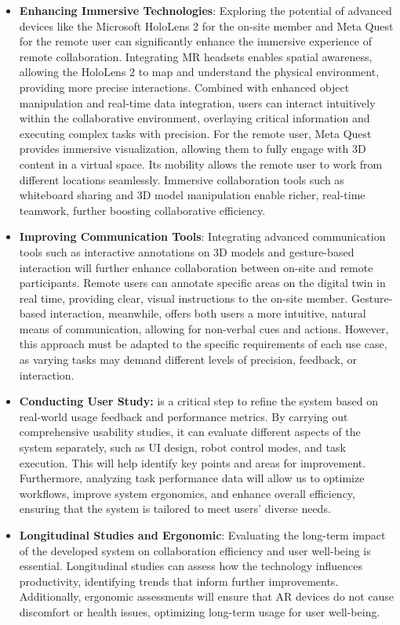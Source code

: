 \begin{itemize}
    \item \textbf{Enhancing Immersive Technologies}: Exploring the potential of advanced devices like the Microsoft HoloLens 2 for the on-site member and Meta Quest for the remote user can significantly enhance the immersive experience of remote collaboration. Integrating \ac{MR} headsets enables spatial awareness, allowing the HoloLens 2 to map and understand the physical environment, providing more precise interactions. Combined with enhanced object manipulation and real-time data integration, users can interact intuitively within the collaborative environment, overlaying critical information and executing complex tasks with precision. 
    For the remote user, Meta Quest provides immersive visualization, allowing them to fully engage with 3D content in a virtual space. Its mobility allows the remote user to work from different locations seamlessly. Immersive collaboration tools such as whiteboard sharing and 3D model manipulation enable richer, real-time teamwork, further boosting collaborative efficiency. 
    \item \textbf{Improving Communication Tools}: Integrating advanced communication tools such as interactive annotations on 3D models and gesture-based interaction will further enhance collaboration between on-site and remote participants. Remote users can annotate specific areas on the digital twin in real time, providing clear, visual instructions to the on-site member. Gesture-based interaction, meanwhile, offers both users a more intuitive, natural means of communication, allowing for non-verbal cues and actions. However, this approach must be adapted to the specific requirements of each use case, as varying tasks may demand different levels of precision, feedback, or interaction.
    \item \textbf{Conducting User Study:} is a critical step to refine the system based on real-world usage feedback and performance metrics. By carrying out comprehensive usability studies, it can evaluate different aspects of the system separately, such as \ac{UI} design, robot control modes, and task execution. This will help identify key points and areas for improvement. Furthermore, analyzing task performance data will allow us to optimize workflows, improve system ergonomics, and enhance overall efficiency, ensuring that the system is tailored to meet users' diverse needs.
    \item \textbf{Longitudinal Studies and Ergonomic}: Evaluating the long-term impact of the developed system on collaboration efficiency and user well-being is essential. Longitudinal studies can assess how the technology influences productivity, identifying trends that inform further improvements. Additionally, ergonomic assessments will ensure that \ac{AR} devices do not cause discomfort or health issues, optimizing long-term usage for user well-being.

\end{itemize}
